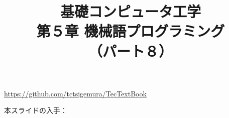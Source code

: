 \documentclass[handout]{beamer}        %
\begin{document}
\title{基礎コンピュータ工学\\第５章 機械語プログラミング\\（パート８）}
\date{}

\begin{frame}
  \titlepage
  \centerline{\url{https://github.com/tctsigemura/TecTextBook}}
  \vfill
  \centerline{本スライドの入手：
    }
\end{frame}

\end{document}
